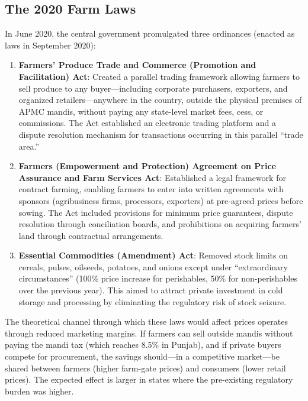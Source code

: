 \documentclass[12pt]{article}
\begin{document}
\subsection{The 2020 Farm Laws}

In June 2020, the central government promulgated three ordinances (enacted as laws in September 2020):

\begin{enumerate}
    \item \textbf{Farmers' Produce Trade and Commerce (Promotion and Facilitation) Act}: Created a parallel trading framework allowing farmers to sell produce to any buyer---including corporate purchasers, exporters, and organized retailers---anywhere in the country, outside the physical premises of APMC mandis, without paying any state-level market fees, cess, or commissions. The Act established an electronic trading platform and a dispute resolution mechanism for transactions occurring in this parallel ``trade area.''

    \item \textbf{Farmers (Empowerment and Protection) Agreement on Price Assurance and Farm Services Act}: Established a legal framework for contract farming, enabling farmers to enter into written agreements with sponsors (agribusiness firms, processors, exporters) at pre-agreed prices before sowing. The Act included provisions for minimum price guarantees, dispute resolution through conciliation boards, and prohibitions on acquiring farmers' land through contractual arrangements.

    \item \textbf{Essential Commodities (Amendment) Act}: Removed stock limits on cereals, pulses, oilseeds, potatoes, and onions except under ``extraordinary circumstances'' (100\% price increase for perishables, 50\% for non-perishables over the previous year). This aimed to attract private investment in cold storage and processing by eliminating the regulatory risk of stock seizure.
\end{enumerate}

The theoretical channel through which these laws would affect prices operates through reduced marketing margins. If farmers can sell outside mandis without paying the mandi tax (which reaches 8.5\% in Punjab), and if private buyers compete for procurement, the savings should---in a competitive market---be shared between farmers (higher farm-gate prices) and consumers (lower retail prices). The expected effect is larger in states where the pre-existing regulatory burden was higher.
\end{document}
